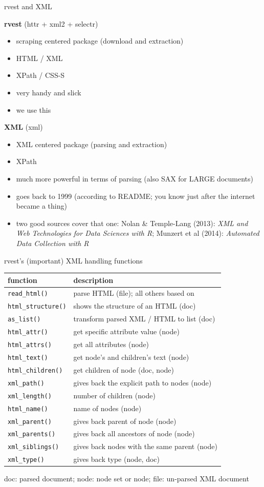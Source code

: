 \documentclass[ignorenonframetext,]{beamer}
\providecommand{\tightlist}{%
  \setlength{\itemsep}{0pt}\setlength{\parskip}{0pt}}
\begin{document}
\begin{frame}{rvest and XML}

\textbf{rvest} (httr + xml2 + selectr)

\begin{itemize}
\tightlist
\item
  scraping centered package (download and extraction)
\item
  HTML / XML
\item
  XPath / CSS-S
\item
  very handy and slick
\item
  we use this
\end{itemize}

\textbf{XML} (xml)

\begin{itemize}
\tightlist
\item
  XML centered package (parsing and extraction)
\item
  XPath
\item
  much more powerful in terms of parsing (also SAX for LARGE documents)
\item
  goes back to 1999 (according to README; you know just after the
  internet became a thing)
\item
  two good sources cover that one: Nolan \& Temple-Lang (2013):
  \emph{XML and Web Technologies for Data Sciences with R}; Munzert et
  al (2014): \emph{Automated Data Collection with R}
\end{itemize}

\end{frame}

\begin{frame}[fragile]{rvest's (important) XML handling functions}

\begin{longtable}[c]{@{}ll@{}}
\toprule
function & description\tabularnewline
\midrule
\endhead
\texttt{read\_html()} & parse HTML (file); all others based
on\tabularnewline
\texttt{html\_structure()} & shows the structure of an HTML
(doc)\tabularnewline
\texttt{as\_list()} & transform parsed XML / HTML to list
(doc)\tabularnewline
\texttt{html\_attr()} & get specific attribute value
(node)\tabularnewline
\texttt{html\_attrs()} & get all attributes (node)\tabularnewline
\texttt{html\_text()} & get node's and children's text
(node)\tabularnewline
\texttt{html\_children()} & get children of node (doc,
node)\tabularnewline
\texttt{xml\_path()} & gives back the explicit path to nodes
(node)\tabularnewline
\texttt{xml\_length()} & number of children (node)\tabularnewline
\texttt{html\_name()} & name of nodes (node)\tabularnewline
\texttt{xml\_parent()} & gives back parent of node (node)\tabularnewline
\texttt{xml\_parents()} & gives back all ancestors of node
(node)\tabularnewline
\texttt{xml\_siblings()} & gives back nodes with the same parent
(node)\tabularnewline
\texttt{xml\_type()} & gives back type (node, doc)\tabularnewline
\bottomrule
\end{longtable}

doc: parsed document; node: node set or node; file: un-parsed XML
document

\end{frame}
\end{document}

